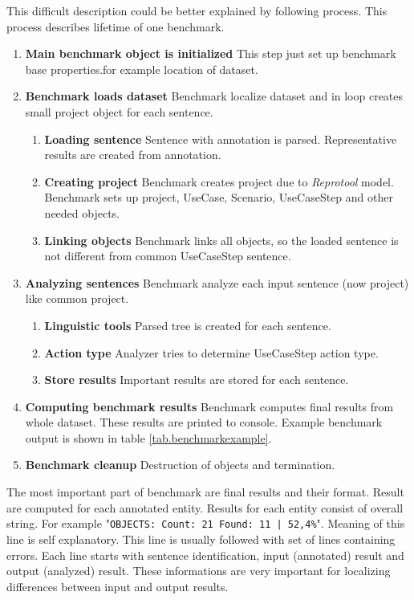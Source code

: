 This difficult description could be better explained by following process. This process describes lifetime of one benchmark.

\begin{enumerate}
\item {\bf Main benchmark object is initialized} This step just set up benchmark base properties.for example location of dataset.

\item {\bf Benchmark loads dataset} Benchmark localize dataset and in loop creates small project object for each sentence.
    \begin{enumerate}
    \item {\bf Loading sentence} Sentence with annotation is parsed. Representative results are created from annotation.
    \item {\bf Creating project} Benchmark creates project due to \emph{Reprotool} model. Benchmark sets up project, UseCase, Scenario, UseCaseStep and other needed objects.
    \item {\bf Linking objects} Benchmark links all objects, so the loaded sentence is not different from common UseCaseStep sentence.
    \end{enumerate}

\item {\bf Analyzing sentences} Benchmark analyze each input sentence (now project)  like common project.
    \begin{enumerate}
    \item {\bf Linguistic tools} Parsed tree is created for each sentence.
    \item {\bf Action type} Analyzer tries to determine UseCaseStep action type.
    \item {\bf Store results} Important results are stored for each sentence.
    \end{enumerate}
\item {\bf Computing benchmark results} Benchmark computes final results from whole dataset. These results are printed to console. Example benchmark output is shown in table \ref{tab.benchmarkexample}.
\item {\bf Benchmark cleanup} Destruction of objects and termination.
\end{enumerate}

The most important part of benchmark are final results and their format. Result are computed for each annotated entity. Results for each entity consist of overall string. For example "{\tt OBJECTS: Count: 21 Found: 11 | 52,4\%}". Meaning of this line is self explanatory. This line is usually followed with set of lines containing errors. Each line starts with sentence identification, input (annotated) result and  output (analyzed) result. These informations are very important for localizing differences between input and output results.

